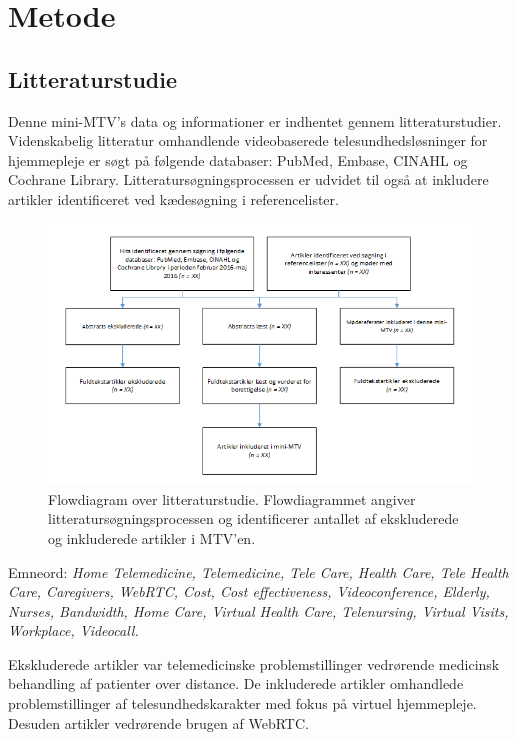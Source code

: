 \chapter{Metode}\label{chap:metode}

\section{Litteraturstudie}
Denne mini-MTV's data og informationer er indhentet gennem litteraturstudier. Videnskabelig litteratur omhandlende videobaserede telesundhedsløsninger for hjemmepleje er søgt på følgende databaser: PubMed, Embase, CINAHL og Cochrane Library. Litteratursøgningsprocessen er udvidet til også at inkludere artikler identificeret ved kædesøgning i referencelister.

\begin{figure}[H]
\centering
\includegraphics[width=1\textwidth]{Figurer/metode_flow.png}
\caption{\label{fig:metodeflow}Flowdiagram over  litteraturstudie. Flowdiagrammet angiver litteratursøgningsprocessen og identificerer antallet af ekskluderede og inkluderede artikler i MTV'en.}
\end{figure}

Emneord: \textit{Home Telemedicine, Telemedicine, Tele Care, Health Care, Tele Health Care, Caregivers, WebRTC, Cost, Cost effectiveness, Videoconference, Elderly, Nurses, Bandwidth, Home Care, Virtual Health Care, Telenursing, Virtual Visits, Workplace, Videocall.}

Ekskluderede artikler var telemedicinske problemstillinger vedrørende medicinsk behandling af patienter over distance. De inkluderede artikler omhandlede problemstillinger af telesundhedskarakter med fokus på virtuel hjemmepleje. Desuden artikler vedrørende brugen af WebRTC.  

